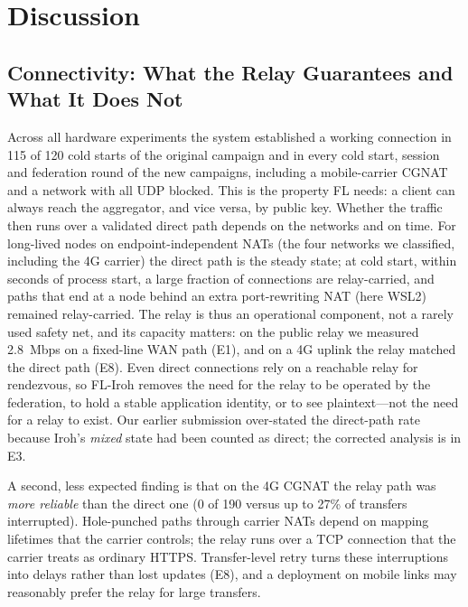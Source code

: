 \section{Discussion}
\label{sec:discussion}

\subsection{Connectivity: What the Relay Guarantees and What It Does Not}

Across all hardware experiments the system established a working connection in 115 of 120 cold starts of the original campaign and in every cold start, session and federation round of the new campaigns, including a mobile-carrier CGNAT and a network with all UDP blocked. This is the property FL needs: a client can always reach the aggregator, and vice versa, by public key. Whether the traffic then runs over a validated direct path depends on the networks and on time. For long-lived nodes on endpoint-independent NATs (the four networks we classified, including the 4G carrier) the direct path is the steady state; at cold start, within seconds of process start, a large fraction of connections are relay-carried, and paths that end at a node behind an extra port-rewriting NAT (here WSL2) remained relay-carried. The relay is thus an operational component, not a rarely used safety net, and its capacity matters: on the public relay we measured 2.8~Mbps on a fixed-line WAN path (E1), and on a 4G uplink the relay matched the direct path (E8). Even direct connections rely on a reachable relay for rendezvous, so FL-Iroh removes the need for the relay to be operated by the federation, to hold a stable application identity, or to see plaintext---not the need for a relay to exist. Our earlier submission over-stated the direct-path rate because Iroh's \emph{mixed} state had been counted as direct; the corrected analysis is in E3.

A second, less expected finding is that on the 4G CGNAT the relay path was \emph{more reliable} than the direct one (0 of 190 versus up to 27\% of transfers interrupted). Hole-punched paths through carrier NATs depend on mapping lifetimes that the carrier controls; the relay runs over a TCP connection that the carrier treats as ordinary HTTPS. Transfer-level retry turns these interruptions into delays rather than lost updates (E8), and a deployment on mobile links may reasonably prefer the relay for large transfers.

